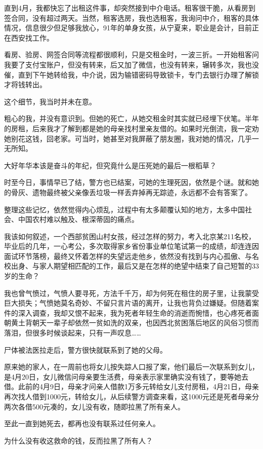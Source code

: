 直到4月，我都快忘了出租这件事，却突然接到中介电话。租客很干脆，从看房到签合同，没有超过两天。当然，租客选房，我也选租客，我询问中介，租客的具体情况，信息很少但足够我放心，91年的单身女孩，从宁夏来，职业是会计，目前正在西安找工作。

看房、验房、网签合同等流程都很顺利，只是交租金时，一波三折。一开始租客问我要了支付宝账户，但没有转来，后又加了微信，也没有转来，辗转多次，我也没催，直到下午她转给我，中介说，因为输错密码导致锁卡，专门去银行办理了解锁才将钱转出。

这个细节，我当时并未在意。

粗心的我，并没有意识到。但她的死亡，从她交租金时其实就已经埋下伏笔。半年的房租，后来我才了解到都是她的母亲找村里亲友借的。如果时光倒流，我一定劝她别花这钱，回老家。可当时，她甚至对我屏蔽了朋友圈，我对她的情况，几乎一无所知。

大好年华本该是奋斗的年纪，但究竟什么是压死她的最后一根稻草？

时至今日，事情早已了结，警方也已结案，可她的生理死因，依然是个谜。就和她的骨灰、遗物最终被父亲像丢垃圾一样丢弃掉再无踪迹，永远都不会有答案了。

整理这些记忆，依然觉得内心烦乱，过程中有太多颠覆认知的地方，太多中国社会、中国农村难以触及、根深蒂固的痛点。

我该如何叙述，一个西部贫困山村女孩，经过怎样的努力，考入北京某211名校，毕业后的几年，一心考公，多次取得家乡省份事业单位笔试第一的成绩，却连连因面试环节落榜，最终又怀着怎样的失望远走他乡，依然没有找到与内心孤傲、与名校出身、与家人期望相匹配的工作，最后又是在怎样的绝望中结束了自己短暂的33岁的生命？

我也曾气愤过，气愤人要寻死，方法千千万，却为何死在租住的房子里，让我蒙受巨大损失；气愤她莫名奇妙、不留只言片语的离开，让我也背负过嫌疑。但随着案件的深入调查，我却又恨不起来，我为死者年轻生命的消逝而惋惜，也心疼死者面朝黄土背朝天一辈子却依然一贫如洗的双亲，也因西北贫困落后地区的风俗习惯而落泪，但很多时候谈起来，只有一声叹息……

尸体被法医拉走后，警方很快就联系到了她的父母。

原来她的家人，在一周前也将女儿按失踪人口报了案，他们最后一次联系到女儿，是4月20日，女儿微信问母亲要生活费，母亲表示家里确实没有钱了，要等她去借。此前的4月9日，母亲才问亲人借款1万多元转给女儿支付房租，4月21日，母亲再次找人借到1000元，转给女儿，从后续警方调查来看，这1000元还是死者母亲分两次各借500元凑的，女儿没有收，随即拉黑了所有亲人。

至此一直到她死去，都再也没有联系过任何亲人。

为什么没有收这救命的钱，反而拉黑了所有人？

